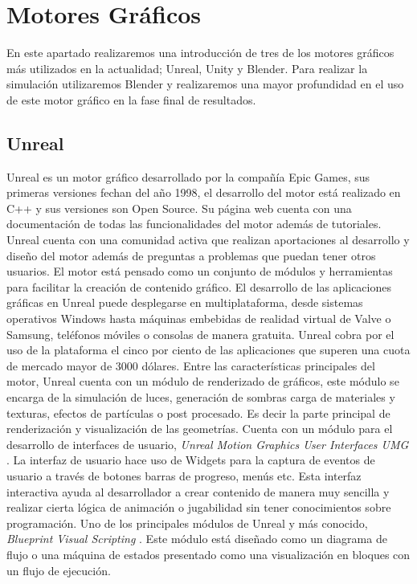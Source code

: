 \documentclass[a4paper]{book}
\begin{document}
\section{Motores Gráficos}
\label{sec:Motores}

En este apartado realizaremos una introducción de tres de los motores gráficos más utilizados
en la actualidad; Unreal, Unity y Blender. Para realizar la simulación utilizaremos Blender y
realizaremos una mayor profundidad en el uso de este motor gráfico en la fase final de resultados.

\subsection{Unreal}
\label{subsec:Unreal}

Unreal es un motor gráfico desarrollado por la compañía Epic Games, sus primeras versiones fechan del año
1998, el desarrollo del motor está realizado en C++ y sus versiones son Open Source. Su página web cuenta
con una documentación de todas las funcionalidades del motor además de tutoriales. Unreal cuenta con una
comunidad activa que realizan aportaciones al desarrollo y diseño del motor además de preguntas a problemas
que puedan tener otros usuarios. El motor está pensado como un conjunto de módulos y herramientas para
facilitar la creación de contenido gráfico. El desarrollo de las aplicaciones gráficas en Unreal puede desplegarse en
multiplataforma, desde sistemas operativos Windows hasta máquinas embebidas de realidad virtual de Valve o Samsung,
teléfonos móviles o consolas de manera gratuita. Unreal cobra por el uso de la plataforma el cinco por ciento de las aplicaciones que
superen una cuota de mercado mayor de 3000 dólares. Entre las características principales del motor, Unreal cuenta con un
módulo de renderizado de gráficos, este módulo se encarga de la simulación de luces, generación de sombras carga de materiales
y texturas, efectos de partículas o post procesado. Es decir la parte principal de renderización y visualización de las geometrías. Cuenta
con un módulo para el desarrollo de interfaces de usuario, \textit{Unreal Motion Graphics User Interfaces UMG} \cite{book:_unreal}. La 
interfaz de usuario hace uso de Widgets para la captura de eventos de usuario a través de botones barras
de progreso, menús etc. Esta interfaz interactiva ayuda al desarrollador a crear contenido de manera muy
sencilla y realizar cierta lógica de animación o jugabilidad sin tener conocimientos sobre programación. Uno de los principales módulos
de Unreal y más conocido, \textit{Blueprint Visual Scripting} \cite{book:_unreal_vs}. Este módulo está diseñado como un diagrama de flujo o una
máquina de estados presentado como una visualización en bloques con un flujo de ejecución.
\end{document}
